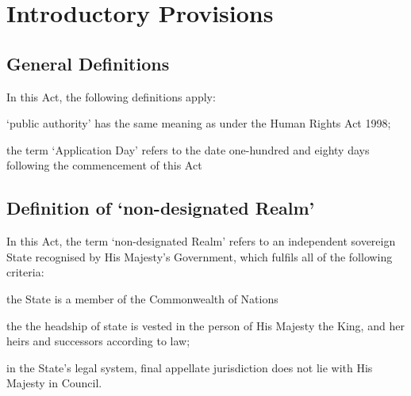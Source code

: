 \documentclass[private]{ukbill}
\begin{document}
\chapter{Introductory Provisions}
\section{General Definitions}

\begin{numstat}
\item In this Act, the following definitions apply:
\begin{alphstat} 
	\item `public authority' has the same meaning as under the Human Rights Act 1998;
	\item the term `Application Day' refers to the date one-hundred and eighty days following the commencement of this Act
	\end{alphstat}
\end{numstat}

\section{Definition of `non-designated Realm'}
\begin{numstat}
	\item In this Act, the term `non-designated Realm' refers to an independent sovereign State recognised by His Majesty's Government, which fulfils all of the following criteria:
\begin{alphstat}
\item the State is a member of the Commonwealth of Nations
\item the the headship of state is vested in the person of His Majesty the King, and her heirs and successors according to law;
\item in the State's legal system, final appellate jurisdiction does not lie with His Majesty in Council.
  	\end{alphstat}
  \end{numstat}
\end{document}
